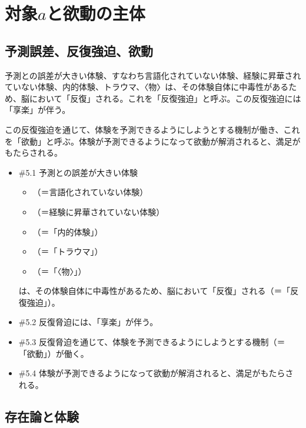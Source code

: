 \section{\texorpdfstring{対象\(a\)と欲動の主体}{対象aと欲動の主体}}\label{ux5bfeux8c61aux3068ux6b32ux52d5ux306eux4e3bux4f53}

\subsection{予測誤差、反復強迫、欲動}\label{ux4e88ux6e2cux8aa4ux5deeux53cdux5fa9ux5f37ux8febux6b32ux52d5}

予測との誤差が大きい体験、すなわち言語化されていない体験、経験に昇華されていない体験、内的体験、トラウマ、〈物〉は、その体験自体に中毒性があるため、脳において「反復」される。これを「反復強迫」と呼ぶ。この反復強迫には「享楽」が伴う。

この反復強迫を通じて、体験を予測できるようにしようとする機制が働き、これを「欲動」と呼ぶ。体験が予測できるようになって欲動が解消されると、満足がもたらされる。

\begin{note}{}
  \begin{itemize}
    \tightlist
    \item{\#5.1}
      予測との誤差が大きい体験
      \begin{itemize}
          \tightlist
          \item
          （＝言語化されていない体験）
          \item
          （＝経験に昇華されていない体験）
          \item
          （＝「内的体験」）
          \item
          （＝「トラウマ」）
          \item
          （＝「〈物〉」）
        \end{itemize}
      は、その体験自体に中毒性があるため、脳において「反復」される（＝「反復強迫」）。
    \item{\#5.2}
      反復脅迫には、「享楽」が伴う。
    \item{\#5.3}
      反復脅迫を通じて、体験を予測できるようにしようとする機制（＝「欲動」）が働く。
    \item{\#5.4}
      体験が予測できるようになって欲動が解消されると、満足がもたらされる。
  \end{itemize}
\end{note}

\subsection{存在論と体験}\label{ux5b58ux5728ux8ad6ux3068ux4f53ux9a13}

